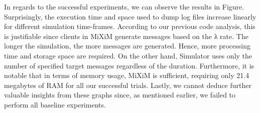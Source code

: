 \documentclass[logo,msc,cyber]{infthesis}   %
\begin{document}
In regards to the successful experiments, we can observe the results in Figure.
Surprisingly, the execution time and space used to dump log files increase
linearly for different simulation time-frames. According to our previous code
analysis, this is justifiable since clients in MiXiM generate messages based on
the λ rate. The longer the simulation, the more messages are generated. Hence,
more processing time and storage space are required. On the other hand,
Simulator uses only the number of specified target messages regardless of the
duration. Furthermore, it is notable that in terms of memory usage, MiXiM is
sufficient, requiring only 21.4 megabytes of RAM for all our successful trials.
Lastly, we cannot deduce further valuable insights from these graphs since, as
mentioned earlier, we failed to perform all baseline experiments.
\end{document}
